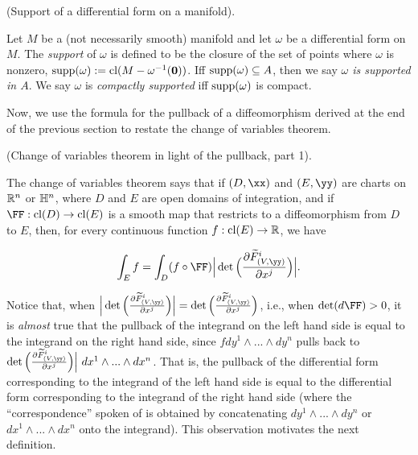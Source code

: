 \begin{defn}
     (Support of a differential form on a manifold).
        
    Let $M$ be a (not necessarily smooth) manifold and let $\omega$ be a differential form on $M$. The \textit{support} of $\omega$ is defined to be the closure of the set of points where $\omega$ is nonzero, $\text{supp}(\omega) := \text{cl}(M - \omega^{-1}(\mathbf{0}))$. Iff $\text{supp}(\omega) \subseteq A$, then we say \textit{$\omega$ is supported in $A$}. We say $\omega$ is \textit{compactly supported} iff $\text{supp}(\omega)$ is compact.
\end{defn}

Now, we use the formula for the pullback of a diffeomorphism derived at the end of the previous section to restate the change of variables theorem.

\begin{deriv}
\label{ch::diff_forms::deriv::change_of_vars_in_light_of_pullback}

     (Change of variables theorem in light of the pullback, part 1).
  
    The change of variables theorem says that if $(D, \xx)$ and $(E, \yy)$ are charts on $\mathbb{R}^n$ or $\mathbb{H}^n$, where $D$ and $E$ are open domains of integration, and if $\FF:\cl(D) \rightarrow \cl(E)$ is a smooth map that restricts to a diffeomorphism from $D$ to $E$, then, for every continuous function $f:\text{cl}(E) \rightarrow \mathbb{R}$, we have
    
    \begin{align*}
        \int_E f = \int_D (f \circ \FF) \Big| \det\Big(\frac{\pd \tF_{(V, \yy)}^i}{\pd x^j} \Big) \Big|.
    \end{align*}

    Notice that, when $\Big| \det\Big(\frac{\pd \tF_{(V, \yy)}^i}{\pd x^j} \Big) \Big| = \det\Big(\frac{\pd \tF_{(V, \yy)}^i}{\pd x^j} \Big)$, i.e., when $\det(d\FF) > 0$, it is \textit{almost} true that the pullback of the integrand on the left hand side is equal to the integrand on the right hand side, since $f dy^1 \wedge ... \wedge dy^n$ pulls back to $\det\Big(\frac{\pd \tF_{(V, \yy)}^i}{\pd x^j} \Big) \Big| \spc dx^1 \wedge ... \wedge dx^n$. That is, the pullback of the differential form corresponding to the integrand of the left hand side is equal to the differential form corresponding to the integrand of the right hand side (where the ``correspondence'' spoken of is obtained by concatenating $dy^1 \wedge ... \wedge dy^n$ or $dx^1 \wedge ... \wedge dx^n$ onto the integrand). This observation motivates the next definition.
\end{deriv}

